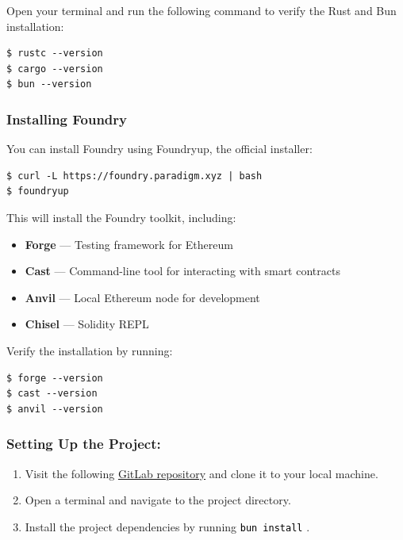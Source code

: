 \documentclass[12pt]{article}
\newcommand{\codegrey}[1]{%
  \texttt{\colorbox{black!4}{\textcolor{black}{#1}}}%
}
\begin{document}
\noindent
Open your terminal and run the following command to verify the Rust and Bun installation:

\begin{verbatim}
$ rustc --version
$ cargo --version
$ bun --version
\end{verbatim}

\subsubsection*{Installing Foundry}
You can install Foundry using Foundryup, the official installer:

\begin{verbatim}
$ curl -L https://foundry.paradigm.xyz | bash
$ foundryup
\end{verbatim}

\noindent
This will install the Foundry toolkit, including:
\begin{itemize}
    \item \textbf{Forge} --- Testing framework for Ethereum
    \item \textbf{Cast} --- Command-line tool for interacting with smart contracts
    \item \textbf{Anvil} --- Local Ethereum node for development
    \item \textbf{Chisel} --- Solidity REPL
\end{itemize}

\noindent
Verify the installation by running:

\begin{verbatim}
$ forge --version
$ cast --version
$ anvil --version
\end{verbatim}

\subsubsection*{Setting Up the Project:}

\begin{enumerate}
    \item Visit the following
          \href{https://gitlab.fel.cvut.cz/radovluk/smart-contracts-exercises/-/tree/main/09-Vulnerabilities-Detection/task/task-code}{GitLab
              repository} and clone it to your local machine.
    \item Open a terminal and navigate to the project directory.
    \item Install the project dependencies by running \codegrey{bun install}.
\end{enumerate}
\end{document}
